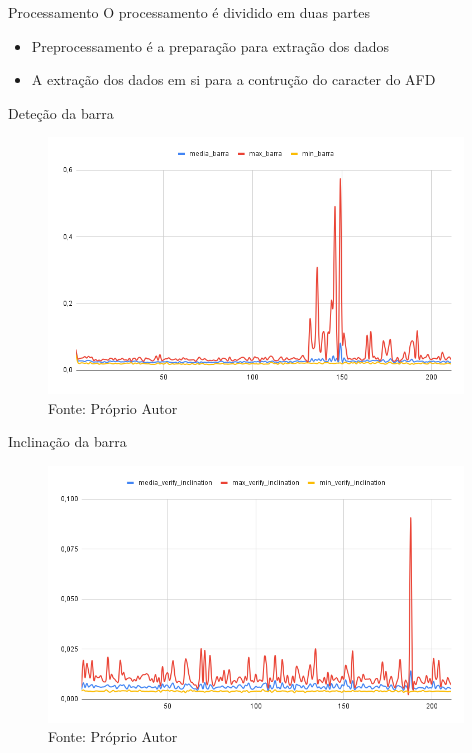 
\begin{frame}{Processamento}
    O processamento é dividido em duas partes
    \begin{itemize}
        \item Preprocessamento  é a preparação para extração dos dados 
        \item A extração dos dados em si para a contrução do caracter do AFD
    \end{itemize}
\end{frame}







\begin{frame}{Deteção da barra}
   \begin{figure}[H]
    \includegraphics[width=11cm]{img/resultados/barra.png}
    {Fonte: Próprio Autor}
    \label{figura:configs_server}
    \end{figure}
\end{frame}

\begin{frame}{Inclinação da barra}
   \begin{figure}[H]
    \includegraphics[width=11cm]{img/resultados/inclination.png}
    {Fonte: Próprio Autor}
    \label{figura:configs_server}
    \end{figure}
\end{frame}


